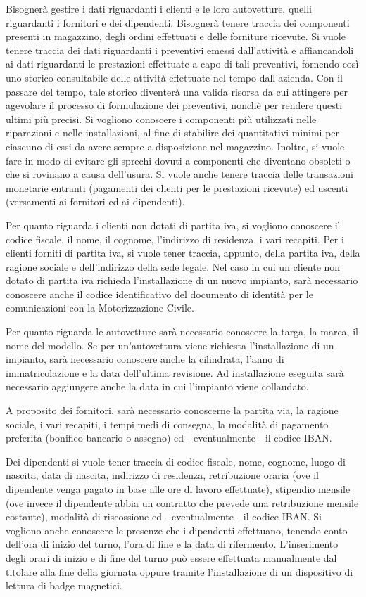		Bisognerà gestire i dati riguardanti i clienti e le loro autovetture, quelli riguardanti i fornitori e dei dipendenti. Bisognerà tenere traccia dei componenti presenti in magazzino, degli ordini effettuati e delle forniture ricevute.
		Si vuole tenere traccia dei dati riguardanti i preventivi emessi dall'attività e affiancandoli ai dati riguardanti le prestazioni effettuate a capo di tali preventivi, fornendo così uno storico consultabile delle attività effettuate nel tempo dall'azienda. Con il passare del tempo, tale storico diventerà una valida risorsa da cui attingere per agevolare il processo di formulazione dei preventivi, nonchè per rendere questi ultimi più precisi.
		Si vogliono conoscere i componenti più utilizzati nelle riparazioni e nelle installazioni, al fine di stabilire dei quantitativi minimi per ciascuno di essi da avere sempre a disposizione nel magazzino. Inoltre, si vuole fare in modo di evitare gli sprechi dovuti a componenti che diventano obsoleti o che si rovinano a causa dell'usura.
		Si vuole anche tenere traccia delle transazioni monetarie entranti (pagamenti dei clienti per le prestazioni ricevute) ed uscenti (versamenti ai fornitori ed ai dipendenti).
		
		Per quanto riguarda i clienti non dotati di partita iva, si vogliono conoscere il codice fiscale, il nome, il cognome, l’indirizzo di residenza, i vari recapiti. Per i clienti forniti di partita iva, si vuole tener traccia, appunto, della partita iva, della ragione sociale e dell’indirizzo della sede legale. 
		Nel caso in cui un cliente non dotato di partita iva richieda l’installazione di un nuovo impianto, sarà necessario conoscere anche il codice identificativo del documento di identità per le comunicazioni con la Motorizzazione Civile.
		
		Per quanto riguarda le autovetture sarà necessario conoscere la targa, la marca, il nome del modello. Se per un’autovettura viene richiesta l’installazione di un impianto, sarà necessario conoscere anche la cilindrata, l’anno di immatricolazione e la data dell’ultima revisione. Ad installazione eseguita sarà necessario aggiungere anche la data in cui l'impianto viene collaudato.
		
		A proposito dei fornitori, sarà necessario conoscerne la partita via, la ragione sociale, i vari recapiti, i tempi medi di consegna, la modalità di pagamento preferita (bonifico bancario o assegno) ed - eventualmente - il codice IBAN.
		
		Dei dipendenti si vuole tener traccia di codice fiscale, nome, cognome, luogo di nascita, data di nascita, indirizzo di residenza, retribuzione oraria (ove il dipendente venga pagato in base alle ore di lavoro effettuate), stipendio mensile (ove invece il dipendente abbia un contratto che prevede una retribuzione mensile costante), modalità di riscossione ed - eventualmente - il codice IBAN. Si vogliono anche conoscere le presenze che i dipendenti effettuano, tenendo conto dell’ora di inizio del turno, l’ora di fine e la data di rifermento. 
		L'inserimento degli orari di inizio e di fine del turno può essere effettuata manualmente dal titolare alla fine della giornata oppure tramite l'installazione di un dispositivo di lettura di badge magnetici.
		
